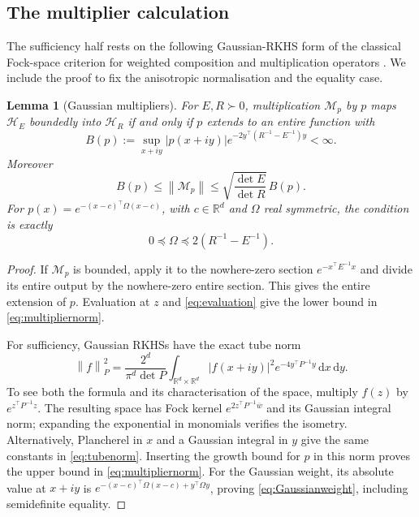 \documentclass[11pt,a4paper]{article}
\newtheorem{lemma}[theorem]{Lemma}
\theoremstyle{remark}
\newcommand{\R}{\mathbb R}
\newcommand{\HH}{\mathcal H}
\newcommand{\dd}{\,\mathrm d}
\newcommand{\norm}[1]{\left\lVert#1\right\rVert}
\newcommand{\Mult}{\mathcal M}
\begin{document}
\subsection{The multiplier calculation}

The sufficiency half rests on the following Gaussian-RKHS form of the
classical Fock-space criterion for weighted composition and
multiplication operators \cite{TienKhoiFock2019,TienKhoi2020}. We
include the proof to fix the anisotropic normalisation and the equality
case.

\begin{lemma}[Gaussian multipliers]\label{lem:multiplier}
For $E,R\succ0$, multiplication $\Mult_p$ by $p$ maps $\HH_E$ boundedly
into $\HH_R$ if and only if $p$ extends to an entire function with
\[
 B(p):=\sup_{x+iy}|p(x+iy)|
                e^{-2y^\top(R^{-1}-E^{-1})y}<\infty.
\]
Moreover
\begin{equation}\label{eq:multipliernorm}
 B(p)\le\norm{\Mult_p}
       \le\sqrt{\frac{\det E}{\det R}}\,B(p).
\end{equation}
For $p(x)=e^{-(x-c)^\top\Omega(x-c)}$, with $c\in\R^d$ and $\Omega$ real
symmetric, the condition is exactly
\begin{equation}\label{eq:Gaussianweight}
 0\preceq \Omega\preceq2(R^{-1}-E^{-1}).
\end{equation}
\end{lemma}

\begin{proof}
If $\Mult_p$ is bounded, apply it to the nowhere-zero section
$e^{-x^\top E^{-1}x}$ and divide its entire output by the
nowhere-zero entire section. This gives the entire extension of
$p$. Evaluation at $z$ and \eqref{eq:evaluation} give the lower
bound in \eqref{eq:multipliernorm}.

For sufficiency, Gaussian RKHSs have the exact tube norm
\begin{equation}\label{eq:tubenorm}
 \norm{f}_P^2=
 \frac{2^d}{\pi^d\det P}
 \int_{\R^d\times\R^d}|f(x+iy)|^2
                  e^{-4y^\top P^{-1}y}\dd x\dd y .
\end{equation}
To see both the formula and its characterisation of the space,
multiply $f(z)$ by $e^{z^\top P^{-1}z}$. The resulting space has
Fock kernel $e^{2z^\top P^{-1}\overline w}$ and its Gaussian
integral norm; expanding the exponential in monomials verifies
the isometry. Alternatively, Plancherel in $x$ and a Gaussian
integral in $y$ give the same constants in \eqref{eq:tubenorm}.
Inserting the growth bound for $p$ in this norm proves the
upper bound in \eqref{eq:multipliernorm}.
For the Gaussian weight, its absolute value at $x+iy$ is
$e^{-(x-c)^\top \Omega(x-c)+y^\top \Omega y}$, proving
\eqref{eq:Gaussianweight}, including semidefinite equality.
\end{proof}
\end{document}
